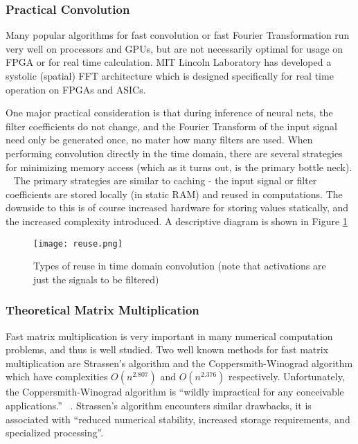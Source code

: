 \subsubsection{Practical Convolution}
Many popular algorithms for fast convolution or fast Fourier Transformation run very well on processors and GPUs, but are not necessarily optimal for usage on FPGA or for real time calculation.  MIT Lincoln Laboratory has developed a systolic (spatial) FFT architecture which is designed specifically for real time operation on FPGAs and ASICs. ~\cite{Jackson}

One major practical consideration is that during inference of neural nets, the filter coefficients do not change, and the Fourier Transform of the input signal need only be generated once, no mater how many filters are used.  When performing convolution directly in the time domain, there are several strategies for minimizing memory access (which as it turns out, is the primary bottle neck). ~\cite{DBLP:journals/corr/ChetlurWVCTCS14} The primary strategies are similar to caching - the input signal or filter coefficients are stored locally (in static RAM) and reused in computations.  The downside to this is of course increased hardware for storing values statically, and the increased complexity introduced.  A descriptive diagram is shown in Figure \ref{reuse}

\begin{figure}[H]
  \centering
  \texttt{[image: reuse.png]}
  \label{reuse}
  \caption{Types of reuse in time domain convolution (note that activations are just the signals to be filtered) ~\cite{DBLP:journals/corr/SzeCYE17}}
\end{figure} 

\subsubsection{Theoretical Matrix Multiplication}
Fast matrix multiplication is very important in many numerical computation problems, and thus is well studied.  Two well known methods for fast matrix multiplication are Strassen's algorithm and the Coppersmith-Winograd algorithm which have complexities $O(n^{2.807})$ and $O(n^{2.376})$ respectively.  Unfortunately, the Coppersmith-Winograd algorithm is ``wildly impractical for any conceivable applications.'' ~\cite{Coppersmith:1987:MMV:28395.28396}.  Strassen's algorithm encounters similar drawbacks, it is associated with ``reduced numerical stability, increased storage requirements, and specialized processing''. ~\cite{DBLP:journals/corr/SzeCYE17}

